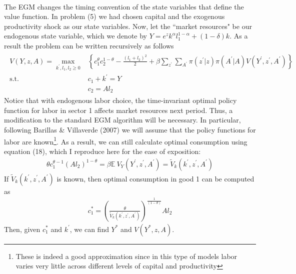 \documentclass[11pt,a4paper]{article}
\begin{document}
\paragraph{} The EGM changes the timing convention of the state variables that define the value function. In problem (5) we had chosen capital and the exogenous productivity shock as our state variables. Now, let the ``market resources" be our endogenous state variable, which we denote by $Y= e^z k^{\alpha} l_1^{1-\alpha} + (1-\delta)k$. As a result the problem can be written recursively as follows
\begin{align}
\begin{split}
V(Y,z,A)=\max _{k^{\prime}, l_1, l_2 \geq 0}&\left\{c_{1}^{\theta} c_{2}^{1-\theta}-\frac{(l_{1}+l_{2})^{2}}{2}+\beta\sum_{z^{\prime}} \sum_{A^{\prime}}\pi\left(z^{\prime}| z\right) \pi\left(A^{\prime} | A\right) V\left( Y^{\prime},z^{\prime},A^{\prime}\right)\right\} \\
\text{s.t.} \quad & c_{1} + k^{\prime} = Y  \\
 & c_{2} = A l_{2} 
\end{split}
\end{align}
Notice that with endogenous labor choice, the time-invariant optimal policy function for labor in sector 1 affects market resources next period. Thus, a modification to the standard EGM algorithm will be necessary. In particular, following Barillas \& Villaverde (2007) we will assume that the policy functions for labor are known\footnote{ These is indeed a good approximation since in this type of models labor varies very little across different levels of capital and productivity}.  As a result, we can still calculate optimal consumption using equation (18), which I reproduce here for the ease of exposition:
\begin{align*}
\theta c_1^{\theta - 1} \left( A l_2\right)^{1-\theta} = \beta \mathbb{E} \: V_Y\left( Y^{\prime},z^{\prime},A^{\prime}\right) = \tilde{V}_k\left( k^{\prime}, z^{\prime},A^{\prime}\right)
\end{align*}
If $\tilde{V}_k\left( k^{\prime}, z^{\prime},A^{\prime}\right)$ is known, then optimal consumption in good 1 can be computed as 
\begin{align}
c_1^* = \left(\frac{\theta}{\tilde{V}_k\left( k^{\prime}, z^{\prime},A^{\prime}\right)}\right)^{\frac{1}{(1-\theta)}}  A l_2
\end{align}
Then, given $c_1^*$ and $k^{\prime}$, we can find $Y^*$ and $V(Y^*, z, A)$.
\end{document}
